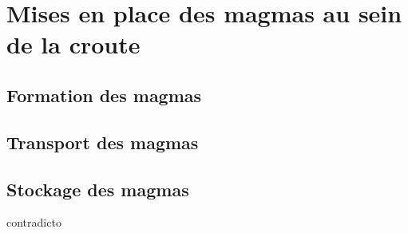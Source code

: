 \documentclass{article} %
\begin{document}
\section{Mises en place des magmas au sein de la croute}
\label{sec:orig-transp-et}

\subsection{Formation des magmas}


\subsection{Transport des magmas}

\subsection{Stockage des magmas}





contradicto
\end{document}
